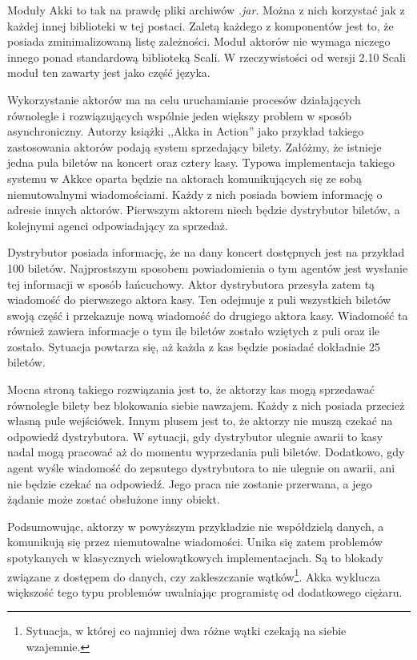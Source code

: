 \documentclass[brudnopis]{xmgr}
\begin{document}
Moduły Akki to tak na prawdę pliki archiwów \emph{.jar}. Można z nich korzystać jak z każdej innej biblioteki w tej postaci. Zaletą każdego z komponentów jest to, że posiada zminimalizowaną listę zależności. Moduł aktorów nie wymaga niczego innego ponad standardową biblioteką Scali. W rzeczywistości od wersji 2.10 Scali moduł ten zawarty jest jako część języka. 

Wykorzystanie aktorów ma na celu uruchamianie procesów działających równolegle i rozwiązujących wspólnie jeden większy problem w sposób asynchroniczny. Autorzy książki ,,Akka in Action'' \cite[s. 9]{Roestenburg:2012:AIA} jako przykład takiego zastosowania aktorów podają system sprzedający bilety. Załóżmy, że istnieje jedna pula biletów na koncert oraz cztery kasy. Typowa implementacja takiego systemu w Akkce oparta będzie na aktorach komunikujących się ze sobą niemutowalnymi wiadomościami. Każdy z nich posiada bowiem informację o adresie innych aktorów. Pierwszym aktorem niech będzie dystrybutor biletów, a kolejnymi agenci odpowiadający za sprzedaż.

Dystrybutor posiada informację, że na dany koncert dostępnych jest na przykład 100 biletów. Najprostszym sposobem powiadomienia o tym agentów jest wysłanie tej informacji w sposób łańcuchowy. Aktor dystrybutora przesyła zatem tą wiadomość do pierwszego aktora kasy. Ten odejmuje z puli wszystkich biletów swoją część i przekazuje nową wiadomość do drugiego aktora kasy. Wiadomość ta również zawiera informacje o tym ile biletów zostało wziętych z puli oraz ile zostało. Sytuacja powtarza się, aż każda z kas będzie posiadać dokładnie 25 biletów.

Mocna stroną takiego rozwiązania jest to, że aktorzy kas mogą sprzedawać równolegle bilety bez blokowania siebie nawzajem. Każdy z nich posiada przecież własną pule wejściówek. Innym plusem jest to, że aktorzy nie muszą czekać na odpowiedź dystrybutora. W sytuacji, gdy dystrybutor ulegnie awarii to kasy nadal mogą pracować aż do momentu wyprzedania puli biletów. Dodatkowo, gdy agent wyśle wiadomość do zepsutego dystrybutora to nie ulegnie on awarii, ani nie będzie czekać na odpowiedź. Jego praca nie zostanie przerwana, a jego żądanie może zostać obsłużone inny obiekt.

Podsumowując, aktorzy w powyższym przykładzie nie współdzielą danych, a komunikują się przez niemutowalne wiadomości. Unika się zatem problemów spotykanych w klasycznych wielowątkowych implementacjach. Są to blokady związane z dostępem do danych, czy zakleszczanie wątków\footnote{Sytuacja, w której co najmniej dwa różne wątki czekają na siebie wzajemnie.}. Akka wyklucza większość tego typu problemów uwalniając programistę od dodatkowego ciężaru.
\end{document}
